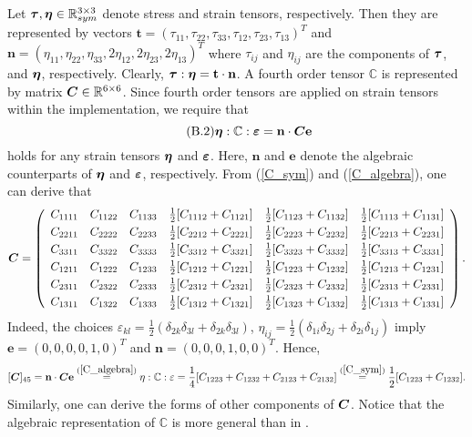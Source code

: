 \documentclass[a4paper,12pt]{article}
\theoremstyle{remark}
\newcommand{\mbf}[1]{\mbox{\boldmath$#1$}}
\numberwithin{equation}{section}
\begin{document}
Let $\mbf \tau, \mbf\eta\in \mathbb R^{3\times 3}_{sym}$ denote stress and strain tensors, respectively. Then they are represented by vectors $\mathbf t=( \tau_{11}, \tau_{22}, \tau_{33}, \tau_{12}, \tau_{23}, \tau_{13})^T$ and $\mathbf n=(\eta_{11},\eta_{22},\eta_{33},2\eta_{12},2\eta_{23},2\eta_{13})^T$ where $\tau_{ij}$ and $\eta_{ij}$ are the components of $\mbf \tau$, and $\mbf\eta$, respectively. Clearly, $\mbf \tau:\mbf\eta=\mathbf t\cdot\mathbf n$. A fourth order tensor $\mathbb C$ is represented by matrix $\mbf C\in\mathbb R^{6\times 6}$. Since fourth order tensors are applied on strain tensors within the implementation, we require that
\begin{equation}
\tag{B.2}
\mbf\eta:\mathbb C:\mbf\varepsilon=\mathbf n\cdot\mbf C\mathbf e
\label{C_algebra}
\end{equation}
holds for any strain tensors $\mbf\eta$ and $\mbf\varepsilon$. Here, $\mathbf n$ and $\mathbf e$ denote the algebraic counterparts of $\mbf\eta$ and $\mbf\varepsilon$, respectively. From (\ref{C_sym}) and (\ref{C_algebra}), one can derive that
$$\mbf C=\left(
\begin{array}{c c c c c c}
C_{1111} & C_{1122} & C_{1133} & \frac{1}{2}[C_{1112}+C_{1121}] & \frac{1}{2}[C_{1123}+C_{1132}] & \frac{1}{2}[C_{1113}+C_{1131}]\\[1mm]
C_{2211} & C_{2222} & C_{2233} & \frac{1}{2}[C_{2212}+C_{2221}] & \frac{1}{2}[C_{2223}+C_{2232}] & \frac{1}{2}[C_{2213}+C_{2231}]\\[1mm]
C_{3311} & C_{3322} & C_{3333} & \frac{1}{2}[C_{3312}+C_{3321}] & \frac{1}{2}[C_{3323}+C_{3332}] & \frac{1}{2}[C_{3313}+C_{3331}]\\[1mm]
C_{1211} & C_{1222} & C_{1233} & \frac{1}{2}[C_{1212}+C_{1221}] & \frac{1}{2}[C_{1223}+C_{1232}] & \frac{1}{2}[C_{1213}+C_{1231}]\\[1mm]
C_{2311} & C_{2322} & C_{2333} & \frac{1}{2}[C_{2312}+C_{2321}] & \frac{1}{2}[C_{2323}+C_{2332}] & \frac{1}{2}[C_{2313}+C_{2331}]\\[1mm]
C_{1311} & C_{1322} & C_{1333} & \frac{1}{2}[C_{1312}+C_{1321}] & \frac{1}{2}[C_{1323}+C_{1332}] & \frac{1}{2}[C_{1313}+C_{1331}]
\end{array}
\right).$$
Indeed, the choices $\varepsilon_{kl}=\frac{1}{2}(\delta_{2k}\delta_{3l}+\delta_{2k}\delta_{3l})$, $\eta_{ij}=\frac{1}{2}(\delta_{1i}\delta_{2j}+\delta_{2i}\delta_{1j})$ imply $\mathbf e=(0,0,0,0,1,0)^T$ and $\mathbf n=(0,0,0,1,0,0)^T$. Hence,
$$[\mbf C]_{45}=\mathbf n\cdot \mbf C\mathbf e\stackrel{(\ref{C_algebra})}{=}\eta:\mathbb C:\varepsilon=\frac{1}{4}[C_{1223}+C_{1232}+C_{2123}+C_{2132}]\stackrel{(\ref{C_sym})}{=}\frac{1}{2}[C_{1223}+C_{1232}].$$
Similarly, one can derive the forms of other components of $\mbf C$. Notice that the algebraic representation of $\mathbb C$ is more general than in \cite[Appendix D]{NPO08}.
\end{document}
